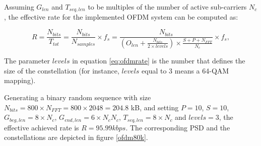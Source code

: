 \documentclass[12pt,a4paper,openright]{report}
\begin{document}
Assuming $G_{len}$ and $T_{seq,len}$ to be multiples of the number of active sub-carriers $N_c$, the effective rate for the implemented OFDM system can be computed as:

\begin{equation}\label{eq:ofdmrate}
R=\frac{N_{bits}}{T_{tot}} = \frac{N_{bits}}{N_{samples}} \times f_s =
\frac{N_{bits}}{(O_{len} + \frac{N_{bits}}{2\times levels})\times \frac{S+P+N_{FFT}}{N_c}} \times f_s,
\end{equation}

The parameter $levels$ in equation \ref{eq:ofdmrate} is the number that defines the size of the constellation (for instance, $levels$ equal to 3 means a 64-QAM mapping).

Generating a binary random sequence with size $N_{bits} =800 \times N_{FFT} = 800 \times 2048 = 204.8$ kB, and setting $P=10$, $S=10$, $G_{beg,len}=8 \times N_c$, $G_{end,len}=6\times N_c N_c$, $T_{seq,len}=8\times N_c$ and $levels = 3$, the effective achieved rate is $R= 95.99 kbps $. The corresponding PSD and the constellations are depicted in figure \ref{ofdm80k}.
\end{document}

